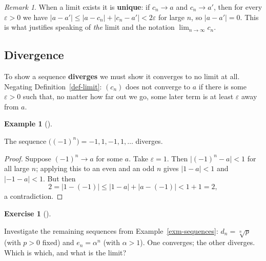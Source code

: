 \documentclass[
  letterpaper,
  DIV=11,
  numbers=noendperiod]{scrreprt}
\theoremstyle{plain}
\theoremstyle{plain}
\theoremstyle{definition}
\theoremstyle{definition}
\newtheorem{exercise}{Exercise}[chapter]
\theoremstyle{definition}
\newtheorem{example}{Example}[chapter]
\theoremstyle{plain}
\theoremstyle{plain}
\theoremstyle{remark}
\newtheorem{refremark}{Remark}[chapter]
\begin{document}
\begin{refremark}
When a limit exists it is \textbf{unique}: if \(c_n \to a\) and
\(c_n \to a'\), then for every \(\varepsilon>0\) we have
\(\lvert a - a' \rvert \le \lvert a - c_n \rvert + \lvert c_n - a' \rvert < 2\varepsilon\)
for large \(n\), so \(\lvert a-a' \rvert = 0\). This is what justifies
speaking of \emph{the} limit and the notation \(\lim_{n\to\infty} c_n\).

\label{rem-limit-unique}

\end{refremark}

\subsection{Divergence}\label{divergence}

To show a sequence \textbf{diverges} we must show it converges to no
limit at all. Negating Definition~\ref{def-limit}: \((c_n)\) does not
converge to \(a\) if there is some \(\varepsilon>0\) such that, no
matter how far out we go, some later term is at least \(\varepsilon\)
away from \(a\).

\begin{example}[]\protect\hypertarget{exm-alternating-diverges}{}\label{exm-alternating-diverges}

\hfill\break
The sequence \(\big((-1)^n\big) = -1, 1, -1, 1, \ldots\) diverges.

\begin{proof}
Suppose \((-1)^n \to a\) for some \(a\). Take \(\varepsilon= 1\). Then
\(\lvert (-1)^n - a \rvert < 1\) for all large \(n\); applying this to
an even and an odd \(n\) gives \(\lvert 1 - a \rvert < 1\) and
\(\lvert -1 - a \rvert < 1\). But then \[
2 = \lvert 1 - (-1) \rvert \le \lvert 1 - a \rvert + \lvert a - (-1) \rvert < 1 + 1 = 2,
\] a contradiction.
\end{proof}

\end{example}

\begin{exercise}[]\protect\hypertarget{exr-sequences-limits}{}\label{exr-sequences-limits}

Investigate the remaining sequences from Example~\ref{exm-sequences}:
\(d_n = \sqrt[n]{p}\) (with \(p>0\) fixed) and \(e_n = \alpha^n\) (with
\(\alpha>1\)). One converges; the other diverges. Which is which, and
what is the limit?

\end{exercise}
\end{document}

